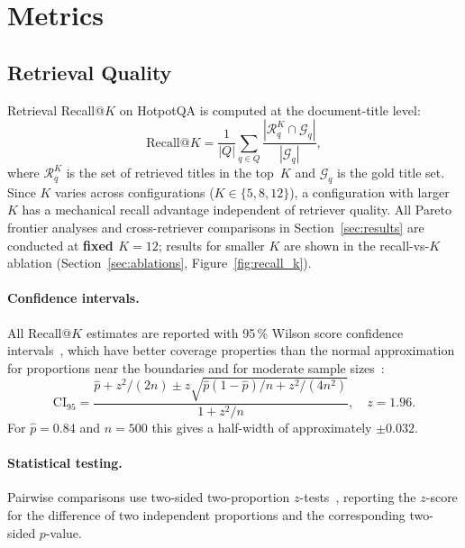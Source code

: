 \documentclass[11pt,a4paper]{article}
\begin{document}
\section{Metrics}
\label{sec:metrics}

\subsection{Retrieval Quality}

Retrieval Recall@$K$ on HotpotQA is computed at the document-title level:
\begin{equation}
  \text{Recall@}K = \frac{1}{|Q|} \sum_{q \in Q}
    \frac{|\mathcal{R}_q^K \cap \mathcal{G}_q|}{|\mathcal{G}_q|},
  \label{eq:recall}
\end{equation}
where $\mathcal{R}_q^K$ is the set of retrieved titles in the top~$K$ and
$\mathcal{G}_q$ is the gold title set.
Since $K$ varies across configurations ($K \in \{5, 8, 12\}$), a configuration
with larger $K$ has a mechanical recall advantage independent of retriever
quality.
All Pareto frontier analyses and cross-retriever comparisons in
Section~\ref{sec:results} are conducted at \textbf{fixed $K = 12$}; results
for smaller $K$ are shown in the recall-vs-$K$ ablation
(Section~\ref{sec:ablations}, Figure~\ref{fig:recall_k}).

\paragraph{Confidence intervals.}
All Recall@$K$ estimates are reported with 95\,\% Wilson score confidence
intervals~\citep{wilson1927probable}, which have better coverage properties
than the normal approximation for proportions near the boundaries and for
moderate sample sizes~\citep{agresti1998approximate}:
\begin{equation}
  \mathrm{CI}_{95} = \frac{\hat{p} + z^2/(2n) \pm z\sqrt{\hat{p}(1-\hat{p})/n
  + z^2/(4n^2)}}{1 + z^2/n},
  \quad z = 1.96.
  \label{eq:wilson}
\end{equation}
For $\hat{p} = 0.84$ and $n = 500$ this gives a half-width of approximately
$\pm 0.032$.

\paragraph{Statistical testing.}
Pairwise comparisons use two-sided two-proportion $z$-tests~\citep{altman1991practical},
reporting the $z$-score for the difference of two independent proportions
and the corresponding two-sided $p$-value.
\end{document}
